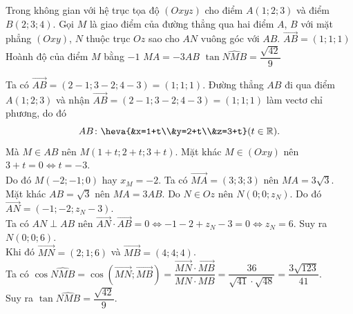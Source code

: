 \begin{ex}%
	Trong không gian với hệ trục tọa độ $(Oxyz)$ cho điểm $A(1;2;3)$ và điểm $B(2;3;4)$. Gọi $M$ là giao điểm của đường thẳng qua hai điểm $A$, $B$ với mặt phẳng $(Oxy)$, $N$ thuộc trục $Oz$ sao cho $AN$ vuông góc với $AB$.
	\choiceTF
	{\True $\overrightarrow{AB}=(1;1;1)$}
	{Hoành độ của điểm $M$ bằng $-1$}
	{$MA=-3AB$}
	{\True $\tan \widehat{NMB}=\dfrac{\sqrt{42}}{9}$}
	\loigiai
	{
		\begin{itemchoice}
			\itemch Ta có $\overrightarrow{AB}=(2-1;3-2;4-3)=(1;1;1)$.
			\itemch Đường thẳng $AB$ đi qua điểm $A(1;2;3)$ và nhận $\overrightarrow{AB}=(2-1;3-2;4-3)=(1;1;1)$ làm vectơ chỉ phương, do đó $$AB\colon \heva{&x=1+t\\&y=2+t\\&z=3+t} (t\in\mathbb{R}).$$
			Mà $M\in AB$ nên $M(1+t;2+t;3+t)$. Mặt khác $M\in (Oxy)$ nên $3+t=0\Leftrightarrow t=-3$.\\
			Do đó $M(-2;-1;0)$ hay $x_M=-2$.
			\itemch Ta có $\overrightarrow{MA}=(3;3;3)$ nên $MA=3\sqrt{3}$. Mặt khác $AB=\sqrt{3}$ nên $MA=3AB$.
			\itemch Do $N\in Oz$ nên $N(0;0;z_N)$. Do đó $\overrightarrow{AN}=(-1;-2;z_N-3)$.\\
			Ta có $AN\perp AB$ nên $\overrightarrow{AN}\cdot\overrightarrow{AB}=0\Leftrightarrow -1-2+z_N-3=0\Leftrightarrow z_N=6$. Suy ra $N(0;0;6)$.\\
			Khi đó $\overrightarrow{MN}=(2;1;6)$ và $\overrightarrow{MB}=(4;4;4)$.\\
			Ta có $\cos \widehat{NMB}=\cos \left(\overrightarrow{MN};\overrightarrow{MB}\right)=\dfrac{\overrightarrow{MN}\cdot \overrightarrow{MB}}{MN\cdot MB}=\dfrac{36}{\sqrt{41}\cdot\sqrt{48}}=\dfrac{3\sqrt{123}}{41}$.\\
			Suy ra $\tan \widehat{NMB}=\dfrac{\sqrt{42}}{9}$.
		\end{itemchoice}
	}
\end{ex}




